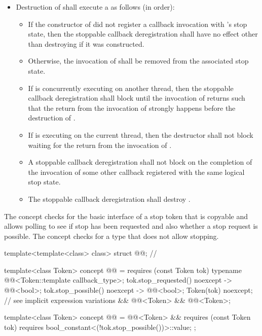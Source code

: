 \begin{itemize}
\item
Destruction of  shall execute
a  as follows (in order):
\begin{itemize}
\item
If the constructor of  did not register
a callback invocation with 's stop state,
then the stoppable callback deregistration shall have no effect
other than destroying  if it was constructed.
\item
Otherwise, the invocation of  shall be removed
from the associated stop state.
\item
If  is concurrently executing on another thread,
then the stoppable callback deregistration shall block
until the invocation of  returns
such that the return from the invocation of 
strongly happens before
the destruction of .
\item
If  is executing on the current thread,
then the destructor shall not block
waiting for the return from the invocation of .
\item
A stoppable callback deregistration shall not block
on the completion of the invocation of some other callback
registered with the same logical stop state.
\item
The stoppable callback deregistration shall destroy .
\end{itemize}
\end{itemize}

\pnum
The  concept checks
for the basic interface of a stop token
that is copyable and allows polling to see if stop has been requested and
also whether a stop request is possible.
The  concept checks
for a  type that does not allow stopping.
\begin{codeblock}
template<template<class> class>
  struct @@;                               // \expos

template<class Token>
  concept @@ =
    requires (const Token tok) {
      typename @@<Token::template callback_type>;
      { tok.stop_requested() } noexcept -> @@<bool>;
      { tok.stop_possible() } noexcept -> @@<bool>;
      { Token(tok) } noexcept;                  // see implicit expression variations
    } &&
    @@<Token> &&
    @@<Token>;

template<class Token>
  concept @@ =
    @@<Token> &&
    requires (const Token tok) {
      requires bool_constant<(!tok.stop_possible())>::value;
    };
\end{codeblock}

